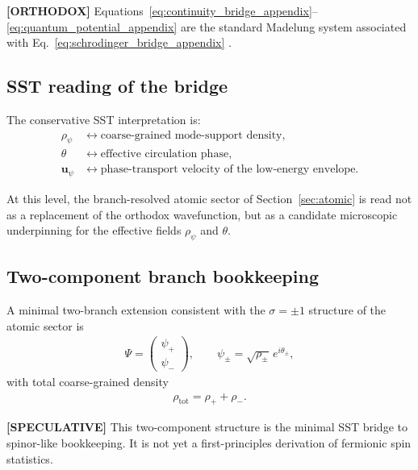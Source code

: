 \documentclass[11pt]{article}
\theoremstyle{definition}
\theoremstyle{plain}
\theoremstyle{remark}
\begin{document}
        \textbf{[ORTHODOX]} Equations~\eqref{eq:continuity_bridge_appendix}--\eqref{eq:quantum_potential_appendix} are the standard Madelung system associated with Eq.~\eqref{eq:schrodinger_bridge_appendix} \cite{Schrodinger1926,Madelung1927}.
    
    \subsection{SST reading of the bridge}
        The conservative SST interpretation is:
        \begin{align}
            \rho_\psi
            &\leftrightarrow
            \text{coarse-grained mode-support density},\\
            \theta
            &\leftrightarrow
            \text{effective circulation phase},\\
            \mathbf{u}_\psi
            &\leftrightarrow
            \text{phase-transport velocity of the low-energy envelope}.
        \end{align}
        
        At this level, the branch-resolved atomic sector of Section~\ref{sec:atomic} is read not as a replacement of the orthodox wavefunction, but as a candidate microscopic underpinning for the effective fields \(\rho_\psi\) and \(\theta\).
    
    \subsection{Two-component branch bookkeeping}
        A minimal two-branch extension consistent with the \(\sigma=\pm1\) structure of the atomic sector is
        \begin{align}
            \Psi
            =
            \begin{pmatrix}
                \psi_{+}\\
                \psi_{-}
            \end{pmatrix},
            \qquad
            \psi_{\pm}
            =
            \sqrt{\rho_{\pm}}\,e^{i\theta_{\pm}},
            \label{eq:two_component_bridge}
        \end{align}
        with total coarse-grained density
        \begin{align}
            \rho_{\mathrm{tot}} = \rho_{+}+\rho_{-}.
        \end{align}
        
        \textbf{[SPECULATIVE]} This two-component structure is the minimal SST bridge to spinor-like bookkeeping. It is not yet a first-principles derivation of fermionic spin statistics.
    
\end{document}
